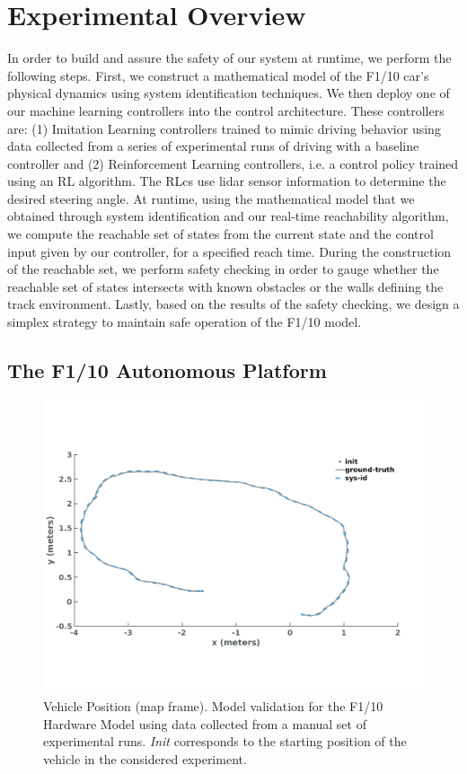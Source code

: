 \documentclass[manuscript,screen,review]{acmart}
\begin{document}
\section{Experimental Overview}

In order to build and assure the safety of our system at runtime, we perform the following steps. First, we construct a mathematical model of the F1/10 car's physical dynamics using system identification techniques. We then deploy one of our machine learning controllers into the control architecture. These controllers are: (1) Imitation Learning controllers trained to mimic driving behavior using data collected from a series of experimental runs of driving with a baseline controller and (2) Reinforcement Learning controllers, i.e. a control policy trained using an RL algorithm. The RLcs use lidar sensor information to determine the desired steering angle. At runtime, using the mathematical model that we obtained through system identification and our real-time reachability algorithm, we compute the reachable set of states from the current state and the control input given by our controller, for a specified reach time. During the construction of the reachable set, we perform safety checking in order to gauge whether the reachable set of states intersects with known obstacles or the walls defining the track environment. Lastly, based on the results of the safety checking, we design a simplex strategy to maintain safe operation of the F1/10 model. 

\subsection{The F1/10 Autonomous Platform}

\begin{figure}[htbp]%
  \centering
    \includegraphics[width=0.85\linewidth]{figures/sys_id2_2.pdf}
  \caption{Vehicle Position (map frame). Model validation for the F1/10 Hardware Model using data collected from a manual set of experimental runs. \emph{Init} corresponds to the starting position of the vehicle in the considered experiment.}
  \label{fig:validation}
\end{figure}%
\end{document}
